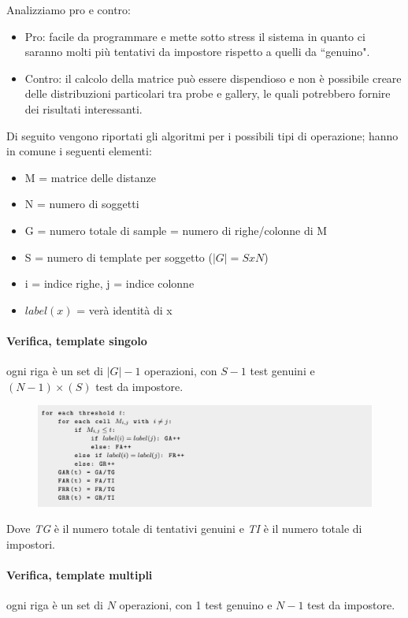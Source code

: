 \documentclass{article}
\begin{document}
Analizziamo pro e contro:
\begin{itemize}
    \item Pro: facile da programmare e mette sotto stress il sistema in quanto ci saranno molti più tentativi da impostore rispetto a quelli da ``genuino".
    \item Contro: il calcolo della matrice può essere dispendioso e non è possibile creare delle distribuzioni particolari tra probe e gallery, le quali potrebbero fornire dei risultati interessanti.
\end{itemize}

Di seguito vengono riportati gli algoritmi per i possibili tipi di operazione; hanno in comune i seguenti elementi:
\begin{itemize}
    \item M = matrice delle distanze
    \item N = numero di soggetti
    \item G = numero totale di sample = numero di righe/colonne di M
    \item S = numero di template per soggetto ($|G| = S x N$)
    \item i = indice righe, j = indice colonne
    \item $label(x) $ = verà identità di x
\end{itemize}

\bigskip
\paragraph{Verifica, template singolo} ogni riga è un set di $|G|-1$ operazioni, con $S-1$ test genuini e $(N-1)\times(S)$ test da impostore.

\begin{figure}[H]
    \centering
    \includegraphics[width=5in]{imgs/verifica-st.PNG}
    \caption{}
    \label{fig:verifica-st}
\end{figure}
Dove \textit{TG} è il numero totale di tentativi genuini e \textit{TI} è il numero totale di impostori.


\paragraph{Verifica, template multipli} ogni riga è un set di $N$ operazioni, con 1 test genuino e $N-1$ test da impostore.
\end{document}
